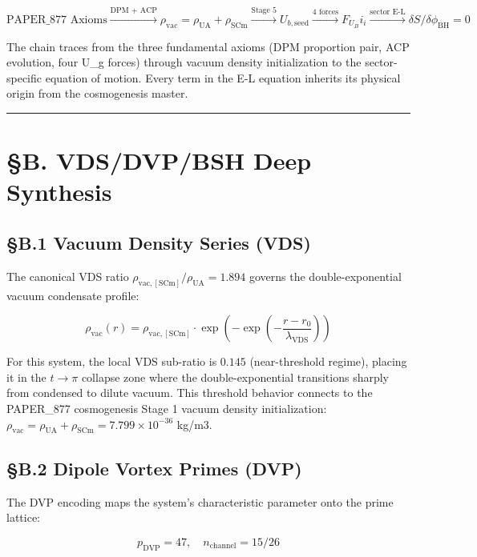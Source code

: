 \documentclass[12pt,a4paper]{article}
\begin{document}
\begin{equation}
\text{PAPER\_877 Axioms} \xrightarrow{\text{DPM + ACP}} \rho_{\mathrm{vac}} = \rho_{\mathrm{UA}} + \rho_{\mathrm{SCm}} \xrightarrow{\text{Stage 5}} U_{b,\mathrm{seed}} \xrightarrow{\text{4 forces}} F_U_Bi_i \xrightarrow{\text{sector E-L}} \delta S/\delta \phi_{\mathrm{BH}} = 0
\end{equation}

The chain traces from the three fundamental axioms (DPM proportion pair, ACP evolution, four U\_g forces) through vacuum density initialization to the sector-specific equation of motion. Every term in the E-L equation inherits its physical origin from the cosmogenesis master.

\medskip\hrule\medskip

\section{\S{}B. VDS/DVP/BSH Deep Synthesis}

\subsection{\S{}B.1 Vacuum Density Series (VDS)}

The canonical VDS ratio $\rho_{\mathrm{vac,[SCm]}} / \rho_{\mathrm{UA}} = 1.894$ governs the double-exponential vacuum condensate profile:

\begin{equation}
\rho_{\mathrm{vac}}(r) = \rho_{\mathrm{vac,[SCm]}} \cdot \exp\!\left(-\exp\!\left(-\frac{r - r_0}{\lambda_{\mathrm{VDS}}}\right)\right)
\end{equation}

For this system, the local VDS sub-ratio is $0.145$ (near-threshold regime), placing it in the $t \to \pi$ collapse zone where the double-exponential transitions sharply from condensed to dilute vacuum. This threshold behavior connects to the PAPER\_877 cosmogenesis Stage 1 vacuum density initialization: $\rho_{\mathrm{vac}} = \rho_{\mathrm{UA}} + \rho_{\mathrm{SCm}} = 7.799 \times 10^{-36}$ kg/m3.

\subsection{\S{}B.2 Dipole Vortex Primes (DVP)}

The DVP encoding maps the system's characteristic parameter onto the prime lattice:

\begin{equation}
p_{\mathrm{DVP}} = 47, \quad n_{\mathrm{channel}} = 15/26
\end{equation}
\end{document}
